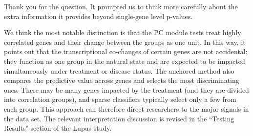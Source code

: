 \documentclass{article}
\theoremstyle{definition}
\begin{document}
Thank you for the question. It prompted us to think more carefully about the extra information it provides beyond single-gene level p-values.

We think the most notable distinction is that the PC module tests treat highly correlated genes and their change between the groups as one unit. In this way, it points out that the transcriptional co-changes of certain genes are not accidental; they function as one group in the natural state and are expected to be impacted simultaneously under treatment or disease status. The anchored method also compares the predictive value across genes and selects the most discriminating ones. There may be many genes impacted by the treatment (and they are divided into correlation groups), and sparse classifiers typically select only a few from each group. This approach can therefore direct researchers to the major signals in the data set. The relevant interpretation discussion is revised in the ``Testing Results" section of the Lupus study.





\end{document}

